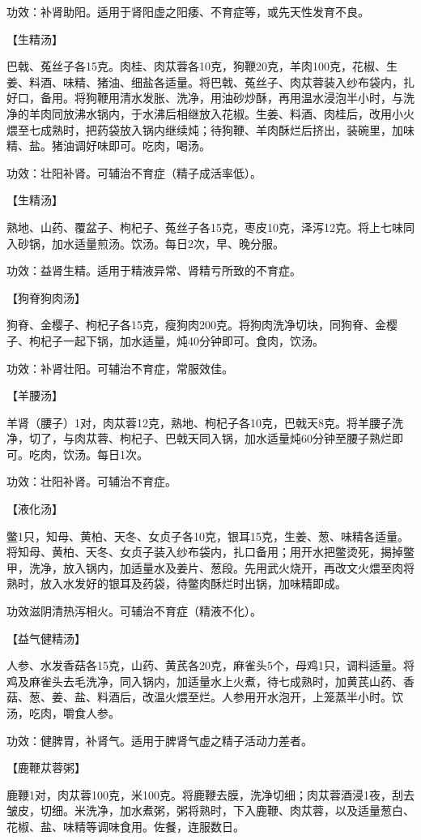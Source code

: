 \documentclass[12pt,UTF8,openany]{ctexbook}
\begin{document}
功效：补肾助阳。适用于肾阳虚之阳痿、不育症等，或先天性发育不良。

【生精汤】

巴戟、菟丝子各15克。肉桂、肉苁蓉各10克，狗鞭20克，羊肉100克，花椒、生姜、料酒、味精、猪油、细盐各适量。将巴戟、菟丝子、肉苁蓉装入纱布袋内，扎好口，备用。将狗鞭用清水发胀、洗净，用油砂炒酥，再用温水浸泡半小时，与洗净的羊肉同放沸水锅内，于水沸后相继放入花椒。生姜、料酒、肉桂后，改用小火煨至七成熟时，把药袋放入锅内继续炖；待狗鞭、羊肉酥烂后挤出，装碗里，加味精、盐。猪油调好味即可。吃肉，喝汤。

功效：壮阳补肾。可辅治不育症（精子成活率低）。

【生精汤】

熟地、山药、覆盆子、枸杞子、菟丝子各15克，枣皮10克，泽泻12克。将上七味同入砂锅，加水适量煎汤。饮汤。每日2次，早、晚分服。

功效：益肾生精。适用于精液异常、肾精亏所致的不育症。

【狗脊狗肉汤】

狗脊、金樱子、枸杞子各15克，瘦狗肉200克。将狗肉洗净切块，同狗脊、金樱子、枸杞子一起下锅，加水适量，炖40分钟即可。食肉，饮汤。

功效：补肾壮阳。可辅治不育症，常服效佳。

【羊腰汤】

羊肾（腰子）1对，肉苁蓉12克，熟地、枸杞子各10克，巴戟天8克。将羊腰子洗净，切了，与肉苁蓉、枸杞子、巴戟天同入锅，加水适量炖60分钟至腰子熟烂即可。吃肉，饮汤。每日1次。

功效：壮阳补肾。可辅治不育症。

【液化汤】

鳖1只，知母、黄柏、天冬、女贞子各10克，银耳15克，生姜、葱、味精各适量。将知母、黄柏、天冬、女贞子装入纱布袋内，扎口备用；用开水把鳖烫死，揭掉鳖甲，洗净，放入锅内，加适量水及姜片、葱段。先用武火烧开，再改文火煨至肉将熟时，放入水发好的银耳及药袋，待鳖肉酥烂时出锅，加味精即成。

功效滋阴清热泻相火。可辅治不育症（精液不化）。

【益气健精汤】

人参、水发香菇各15克，山药、黄芪各20克，麻雀头5个，母鸡1只，调料适量。将鸡及麻雀头去毛洗净，同入锅内，加适量水上火煮，待七成熟时，加黄芪山药、香菇、葱、姜、盐、料酒后，改温火煨至烂。人参用开水泡开，上笼蒸半小时。饮汤，吃肉，嚼食人参。

功效：健脾胃，补肾气。适用于脾肾气虚之精子活动力差者。

【鹿鞭苁蓉粥】

鹿鞭1对，肉苁蓉100克，米100克。将鹿鞭去膜，洗净切细；肉苁蓉酒浸1夜，刮去皱皮，切细。米洗净，加水煮粥，粥将熟时，下入鹿鞭、肉苁蓉，以及适量葱白、花椒、盐、味精等调味食用。佐餐，连服数日。
\end{document}
